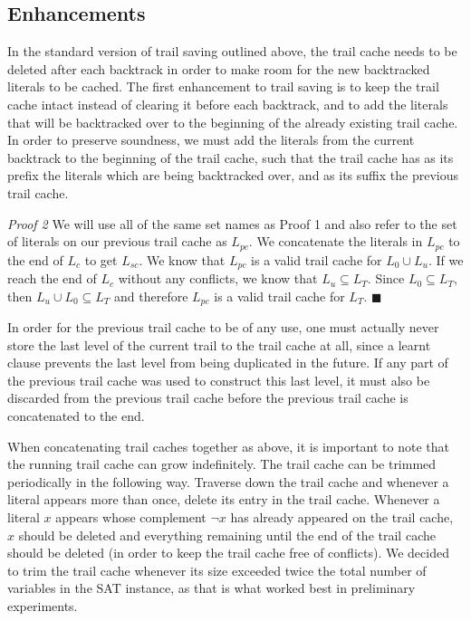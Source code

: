 \documentclass{article}
\begin{document}
\subsection{Enhancements}

In the standard version of trail saving outlined above, the trail cache needs to be deleted after each backtrack in order to make room for the new backtracked literals to be cached. The first enhancement to trail saving is to keep the trail cache intact instead of clearing it before each backtrack, and to add the literals that will be backtracked over to the beginning of the already existing trail cache. In order to preserve soundness, we must add the literals from the current backtrack to the beginning of the trail cache, such that the trail cache has as its prefix the literals which are being backtracked over, and as its suffix the previous trail cache. \newline

\textit{Proof 2} We will use all of the same set names as Proof 1 and also refer to the set of literals on our previous trail cache as $L_{pc}$. We concatenate the literals in $L_{pc}$ to the end of $L_c$ to get $L_{sc}$. We know that $L_{pc}$ is a valid trail cache for $L_0 \cup L_u$. If we reach the end of $L_c$ without any conflicts, we know that $L_u \subseteq L_T$. Since $L_0 \subseteq L_T$, then $L_u \cup L_0 \subseteq L_T$ and therefore $L_{pc}$ is a valid trail cache for $L_T$. $\blacksquare$\newline

In order for the previous trail cache to be of any use, one must actually never store the last level of the current trail to the trail cache at all, since a learnt clause prevents the last level from being duplicated in the future. If any part of the previous trail cache was used to construct this last level, it must also be discarded from the previous trail cache before the previous trail cache is concatenated to the end.

When concatenating trail caches together as above, it is important to note that the running trail cache can grow indefinitely. The trail cache can be trimmed periodically in the following way. Traverse down the trail cache and whenever a literal appears more than once, delete its entry in the trail cache. Whenever a literal $x$ appears whose complement $\lnot x$ has already appeared on the trail cache, $x$ should be deleted and everything remaining until the end of the trail cache should be deleted (in order to keep the trail cache free of conflicts).  We decided to trim the trail cache whenever its size exceeded twice the total number of variables in the SAT instance, as that is what worked best in preliminary experiments.\newline
\end{document}
